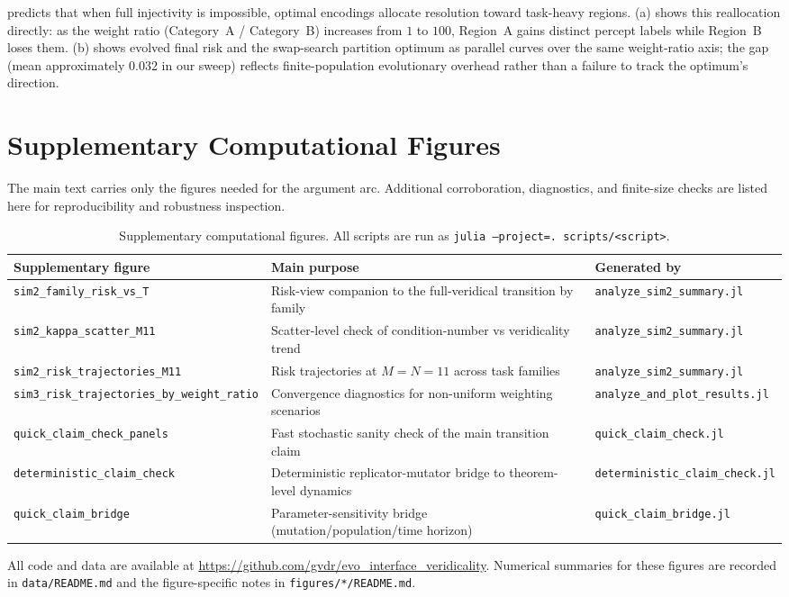 \documentclass[12pt]{article}
\begin{document}
 predicts that when full injectivity is impossible, optimal encodings allocate resolution toward task-heavy regions. (a) shows this reallocation directly: as the weight ratio (Category~A / Category~B) increases from $1$ to $100$, Region~A gains distinct percept labels while Region~B loses them. (b) shows evolved final risk and the swap-search partition optimum as parallel curves over the same weight-ratio axis; the gap (mean approximately $0.032$ in our sweep) reflects finite-population evolutionary overhead rather than a failure to track the optimum's direction.

\section{Supplementary Computational Figures}\label{app:suppfigs}

The main text carries only the figures needed for the argument arc. Additional corroboration, diagnostics, and finite-size checks are listed here for reproducibility and robustness inspection.

\begin{table}
\centering
\small
\begin{tabular}{@{}lll@{}}
\toprule
Supplementary figure & Main purpose & Generated by \\
\midrule
\texttt{sim2\_family\_risk\_vs\_T} & Risk-view companion to the full-veridical transition by family & \texttt{analyze\_sim2\_summary.jl} \\[3pt]
\texttt{sim2\_kappa\_scatter\_M11} & Scatter-level check of condition-number vs veridicality trend & \texttt{analyze\_sim2\_summary.jl} \\[3pt]
\texttt{sim2\_risk\_trajectories\_M11} & Risk trajectories at $M = N = 11$ across task families & \texttt{analyze\_sim2\_summary.jl} \\[3pt]
\texttt{sim3\_risk\_trajectories\_by\_weight\_ratio} & Convergence diagnostics for non-uniform weighting scenarios & \texttt{analyze\_and\_plot\_results.jl} \\[3pt]
\texttt{quick\_claim\_check\_panels} & Fast stochastic sanity check of the main transition claim & \texttt{quick\_claim\_check.jl} \\[3pt]
\texttt{deterministic\_claim\_check} & Deterministic replicator-mutator bridge to theorem-level dynamics & \texttt{deterministic\_claim\_check.jl} \\[3pt]
\texttt{quick\_claim\_bridge} & Parameter-sensitivity bridge (mutation/population/time horizon) & \texttt{quick\_claim\_bridge.jl} \\
\bottomrule
\end{tabular}
\caption{Supplementary computational figures. All scripts are run as \texttt{julia --project=.\ scripts/<script>}.}
\label{tab:supp-figures}
\end{table}

All code and data are available at \url{https://github.com/gvdr/evo_interface_veridicality}.
Numerical summaries for these figures are recorded in \texttt{data/README.md} and the figure-specific notes in \texttt{figures/*/README.md}.
\end{document}
